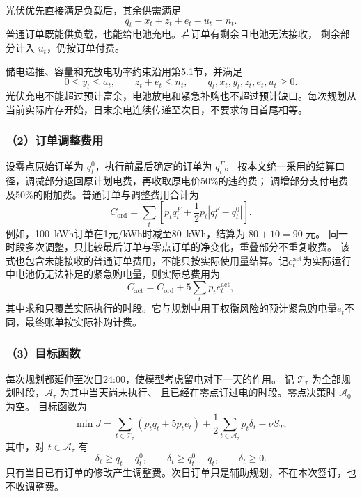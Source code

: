 光伏优先直接满足负载后，其余供需满足
\begin{equation}
q_t-x_t+z_t+e_t-u_t=n_t.
\end{equation}
普通订单既能供负载，也能给电池充电。若订单有剩余且电池无法接收，
剩余部分计入 $u_t$，仍按订单付费。

储电递推、容量和充放电功率约束沿用第5.1节，并满足
\begin{equation}
0\le y_t\le a_t,\qquad z_t+e_t\le n_t,\qquad q_t,x_t,y_t,z_t,e_t,u_t\ge0.
\end{equation}
光伏充电不能超过预计富余，电池放电和紧急补购也不超过预计缺口。每次规划从当前实际库存开始，日末余电连续传递至次日，不要求每日首尾相等。

\subsubsection*{（2）订单调整费用}

设零点原始订单为 $q_t^0$，执行前最后确定的订单为 $q_t^F$。
按本文统一采用的结算口径，调减部分退回原计划电费，再收取原电价50\%的违约费；
调增部分支付电费及50\%的附加费。普通订单与调整费用合计为
\begin{equation}
C_{\mathrm{ord}}=\sum_t\left[p_tq_t^F+\frac12p_t|q_t^F-q_t^0|\right].
\end{equation}
例如，100~kWh订单在1元/kWh时减至80~kWh，结算为 $80+10=90$ 元。
同一时段多次调整，只比较最后订单与零点订单的净变化，重叠部分不重复收费。
该式也包含未能接收的普通订单费用，不能只按实际使用量结算。记$e_t^{\mathrm{act}}$为实际运行中电池仍无法补足的紧急购电量，则实际总费用为
\[
C_{\mathrm{act}}=C_{\mathrm{ord}}+5\sum_t p_t e_t^{\mathrm{act}},
\]
其中求和只覆盖实际执行的时段。它与规划中用于权衡风险的预计紧急购电量$e_t$不同，最终账单按实际补购计费。

\subsubsection*{（3）目标函数}

每次规划都延伸至次日24:00，使模型考虑留电对下一天的作用。
记 $\mathcal T_{\tau}$ 为全部规划时段，$\mathcal A_{\tau}$ 为其中当天尚未执行、
且已经在零点订过电的时段。零点决策时 $\mathcal A_0$ 为空。
目标函数为
\begin{equation}
\min J=\sum_{t\in\mathcal T_{\tau}}(p_tq_t+5p_te_t)
+\frac12\sum_{t\in\mathcal A_{\tau}}p_t\delta_t-\nu S_T,
\end{equation}
其中，对 $t\in\mathcal A_{\tau}$ 有
\begin{equation}
\delta_t\geq q_t-q_t^0,\qquad
\delta_t\geq q_t^0-q_t,\qquad\delta_t\geq0.
\end{equation}
只有当日已有订单的修改产生调整费。次日订单只是辅助规划，不在本次签订，也不收调整费。

